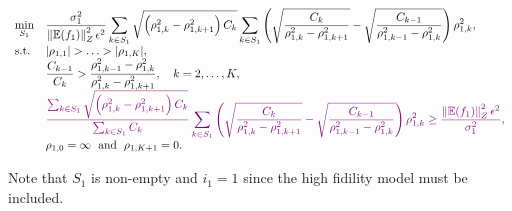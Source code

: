 \documentclass[final,3p,times,11pt]{elsarticle}
\newcommand{\JLcolor}[1]{{\textcolor{violet}{#1}}} %
\newtheorem{theorem}{Theorem}%
\begin{document}
\begin{equation}\label{eq:Optimization_pb_model_selection}
    \begin{array}{lll}
    \displaystyle\min_{S_1} &\displaystyle \frac{\sigma_1^2}{\left\Vert\mathbb{E}(f_1) \right\Vert_{Z}^2\epsilon^2}\sum_{k\in S_1}\sqrt{\left(\rho_{1,k}^2 - \rho_{1,k+1}^2\right)C_k}\sum_{k\in S_1}\left(\sqrt{\frac{C_k}{\rho_{1,k}^2 - \rho_{1,k+1}^2}} - \sqrt{\frac{C_{k-1}}{\rho_{1,{k-1}}^2 - \rho_{1,k}^2}}\right)\rho_{1,k}^2,\\
       \text{s.t.} &\displaystyle |\rho_{1,1}|>\ldots>|\rho_{1,K}|,\\
       &\displaystyle \frac{C_{k-1}}{C_k}>\frac{\rho_{1,k-1}^2-\rho_{1,k}^2}{\rho_{1,k}^2-\rho_{1,k+1}^2}, \quad k=2,\ldots,K,\\
       &\JLcolor{\displaystyle \frac{\sum_{k\in S_1}\sqrt{\left(\rho_{1,k}^2 - \rho_{1,k+1}^2\right)C_k}}{\sum_{k\in S_1} C_k}\sum_{k\in S_1}\left(\sqrt{\frac{C_k}{\rho_{1,k}^2 - \rho_{1,k+1}^2}} - \sqrt{\frac{C_{k-1}}{\rho_{1,{k-1}}^2 - \rho_{1,k}^2}}\right)\rho_{1,k}^2\ge \frac{\left\Vert\mathbb{E}(f_1) \right\Vert_{Z}^2\epsilon^2}{\sigma_1^2},}\\
        &\displaystyle \rho_{1,0}=\infty \;\text{ and } \;\rho_{1,K+1}=0. \\%
    \end{array}
\end{equation}

Note that $S_1$ is non-empty and $i_1=1$ since the high fidility model must be included.



\end{document}
